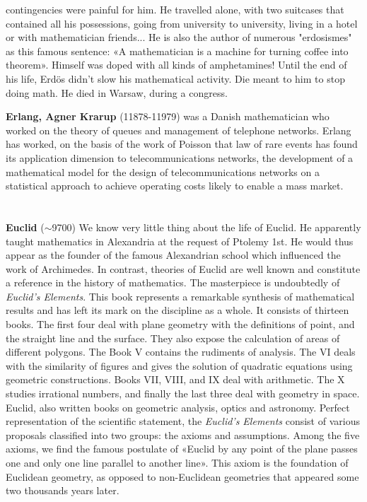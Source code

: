 contingencies were painful for him. He travelled alone, with two suitcases that contained all his possessions, going from university to university, living in a hotel or with mathematician friends... He is also the author of numerous "erdosismes" as this famous sentence: «A mathematician is a machine for turning coffee into theorem». Himself was doped with all kinds of amphetamines! Until the end of his life, Erdös didn't slow his mathematical activity. Die meant to him to stop doing math. He died in Warsaw, during a congress.

\textbf{Erlang, Agner Krarup} (11878-11979) was a Danish mathematician who worked on the theory of queues and management of telephone networks. Erlang has worked, on the basis of the work of Poisson that law of rare events has found its application dimension to telecommunications networks, the development of a mathematical model for the design of telecommunications networks on a statistical approach to achieve operating costs likely to enable a mass market.\\\\\\

\textbf{Euclid} ($\sim$9700) We know very little thing about the life of Euclid. He apparently taught mathematics in Alexandria at the request of Ptolemy 1st. He would thus appear as the founder of the famous Alexandrian school which influenced the work of Archimedes. In contrast, theories of Euclid are well known and constitute a reference in the history of mathematics. The masterpiece is undoubtedly of \textit{Euclid's Elements}. This book represents a remarkable synthesis of mathematical results and has left its mark on the discipline as a whole. It consists of thirteen books. The first four deal with plane geometry with the definitions of point, and the straight line and the surface. They also expose the calculation of areas of different polygons. The Book V contains the rudiments of analysis. The VI deals with the similarity of figures and gives the solution of quadratic equations using geometric constructions. Books VII, VIII, and IX deal with arithmetic. The X studies irrational numbers, and finally the last three deal with geometry in space. Euclid, also written books on geometric analysis, optics and astronomy. Perfect representation of the scientific statement, the \textit{Euclid's Elements} consist of various proposals classified into two groups: the axioms and assumptions. Among the five axioms, we find the famous postulate of «Euclid by any point of the plane passes one and only one line parallel to another line». This axiom is the foundation of Euclidean geometry, as opposed to non-Euclidean geometries that appeared some two thousands years later.

